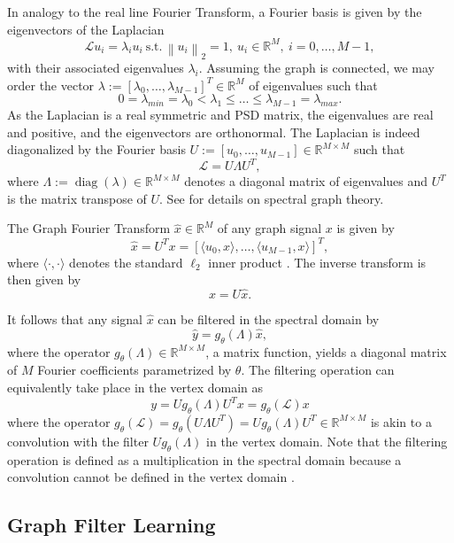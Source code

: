 \documentclass{article}
\DeclareMathOperator*{\diag}{diag}
\renewcommand{\L}{\mathcal{L}}
\newcommand{\R}{\mathbb{R}}
\newcommand{\st}{\ \text{s.t.} \,}
\newcommand{\norm}[1]{\left\| #1 \right\|}
\begin{document}
In analogy to the real line Fourier Transform, a Fourier basis is given
by the eigenvectors of the Laplacian
\[ \L u_i = \lambda_i u_i \st \norm{u_i}_2=1,
\ u_i \in \R^M, \ i = 0, \ldots, M-1, \] with their associated
eigenvalues \(\lambda_i\). Assuming the graph is connected, we may order
the vector \(\lambda := [\lambda_0, \ldots, \lambda_{M-1}]^T \in \R^M\)
of eigenvalues such that
\[ 0 = \lambda_{min} = \lambda_0 < \lambda_1 \leq \ldots \leq
\lambda_{M-1} = \lambda_{max}. \] As the Laplacian is a real symmetric
and \gls{PSD} matrix, the eigenvalues are real and positive, and the
eigenvectors are orthonormal. The Laplacian is indeed diagonalized by
the Fourier basis \(U := [u_0, \ldots, u_{M-1}] \in \R^{M \times M}\)
such that
\begin{equation} \L = U \Lambda U^T, \label{eq:lap_diag}\end{equation}
where \(\Lambda := \diag(\lambda) \in \R^{M \times M}\) denotes a
diagonal matrix of eigenvalues and \(U^T\) is the matrix transpose of
\(U\). See \citep{chung_spectral_1997} for details on spectral graph
theory.

The Graph Fourier Transform \(\hat{x} \in \R^M\) of any graph signal
\(x\) is given by \[ \hat{x} = U^T x =
[\langle u_0, x \rangle, \ldots, \langle u_{M-1}, x \rangle]^T, \] where
\(\langle \cdot , \cdot \rangle\) denotes the standard \(\ell_2\) inner
product \citep{shuman_emerging_2013}. The inverse transform is then
given by \[
x = U \hat{x}. \]

It follows that any signal \(\hat{x}\) can be filtered in the spectral
domain by \[ \hat{y} = g_\theta(\Lambda) \hat{x}, \] where the operator
\(g_\theta(\Lambda) \in \R^{M \times M}\), a matrix function, yields a
diagonal matrix of \(M\) Fourier coefficients parametrized by
\(\theta\). The filtering operation can equivalently take place in the
vertex domain as \[ y = U g_\theta(\Lambda) U^T x = g_\theta(\L) x \]
where the operator
\(g_\theta(\L) = g_\theta(U \Lambda U^T) = U g_\theta(\Lambda) U^T \in \R^{M \times M}\)
is akin to a convolution with the filter \(Ug_\theta(\Lambda)\) in the
vertex domain. Note that the filtering operation is defined as a
multiplication in the spectral domain because a convolution cannot be
defined in the vertex domain \citep{shuman_emerging_2013}.

\subsection{Graph Filter Learning}\label{graph-filter-learning}
\end{document}
